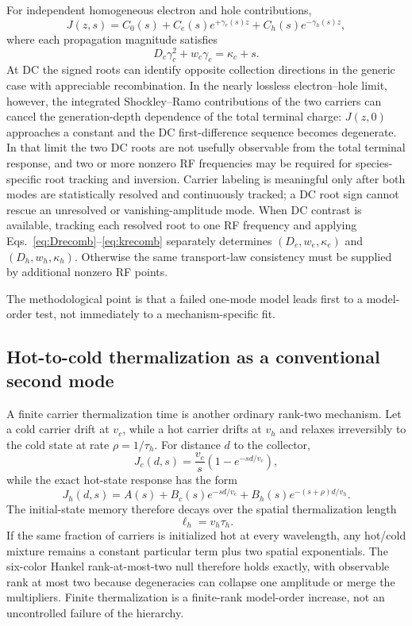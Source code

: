\documentclass[11pt]{article}
\begin{document}
For independent homogeneous electron and hole contributions,
\begin{equation}
J(z,s)=C_0(s)+C_e(s)e^{+\gamma_e(s)z}+C_h(s)e^{-\gamma_h(s)z},
\end{equation}
where each propagation magnitude satisfies
\begin{equation}
D_c\gamma_c^2+w_c\gamma_c=\kappa_c+s.
\end{equation}
At DC the signed roots can identify opposite collection directions in the generic case with appreciable recombination. In the nearly lossless electron--hole limit, however, the integrated Shockley--Ramo contributions of the two carriers can cancel the generation-depth dependence of the total terminal charge: $J(z,0)$ approaches a constant and the DC first-difference sequence becomes degenerate. In that limit the two DC roots are not usefully observable from the total terminal response, and two or more nonzero RF frequencies may be required for species-specific root tracking and inversion. Carrier labeling is meaningful only after both modes are statistically resolved and continuously tracked; a DC root sign cannot rescue an unresolved or vanishing-amplitude mode. When DC contrast is available, tracking each resolved root to one RF frequency and applying Eqs.~\eqref{eq:Drecomb}--\eqref{eq:krecomb} separately determines $(D_e,w_e,\kappa_e)$ and $(D_h,w_h,\kappa_h)$. Otherwise the same transport-law consistency must be supplied by additional nonzero RF points.

The methodological point is that a failed one-mode model leads first to a model-order test, not immediately to a mechanism-specific fit.

\subsection{Hot-to-cold thermalization as a conventional second mode}

A finite carrier thermalization time is another ordinary rank-two mechanism. Let a cold carrier drift at $v_c$, while a hot carrier drifts at $v_h$ and relaxes irreversibly to the cold state at rate $\rho=1/\tau_h$. For distance $d$ to the collector,
\begin{equation}
J_c(d,s)=\frac{v_c}{s}\left(1-e^{-sd/v_c}\right),
\end{equation}
while the exact hot-state response has the form
\begin{equation}
\boxed{J_h(d,s)=A(s)+B_c(s)e^{-sd/v_c}+B_h(s)e^{-(s+\rho)d/v_h}.}
\label{eq:hot_two_mode}
\end{equation}
The initial-state memory therefore decays over the spatial thermalization length
\begin{equation}
\boxed{\ell_h=v_h\tau_h.}
\end{equation}
If the same fraction of carriers is initialized hot at every wavelength, any hot/cold mixture remains a constant particular term plus two spatial exponentials. The six-color Hankel rank-at-most-two null therefore holds exactly, with observable rank at most two because degeneracies can collapse one amplitude or merge the multipliers. Finite thermalization is a finite-rank model-order increase, not an uncontrolled failure of the hierarchy.
\end{document}

